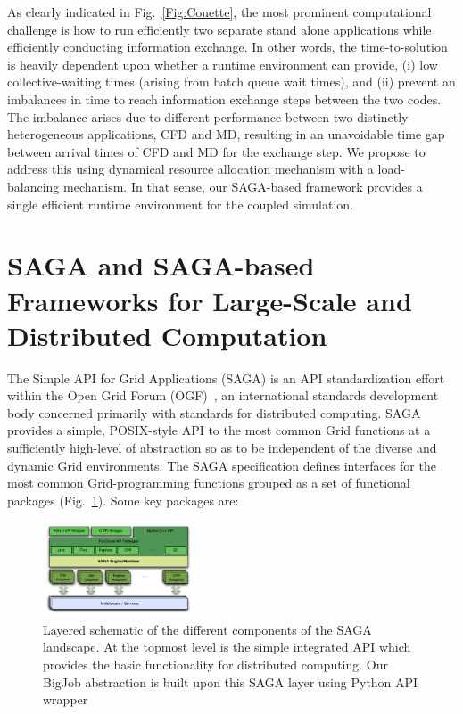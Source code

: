 \documentclass[conference,final]{IEEEtran}
\newcommand{\Nkimnote}[1]{ {\textcolor{green} { ***Nkim: #1 }}}
\newcommand{\Nkimnote}[1]{}
\begin{document}
As clearly indicated in Fig.~\ref{Fig:Couette}, the most prominent
computational challenge is how to run efficiently two separate stand
alone applications while efficiently conducting information exchange.
In other words, the time-to-solution is heavily dependent upon whether
a runtime environment can provide, (i) low collective-waiting times
(arising from batch queue wait times), and (ii) prevent an imbalances
in time to reach information exchange steps between the two codes. The
imbalance arises due to different performance between two distinctly
heterogeneous applications, CFD and MD, resulting in an unavoidable
time gap between arrival times of CFD and MD for the exchange step. We
propose to address this using dynamical resource allocation mechanism
with a load-balancing mechanism. In that sense, our SAGA-based
framework provides a single efficient runtime environment for the
coupled simulation.

\section{SAGA and SAGA-based Frameworks for Large-Scale and Distributed Computation}

The Simple API for Grid Applications (SAGA) is an API standardization
effort within the Open Grid Forum (OGF)~\cite{ogf_web}, an
international standards development body concerned primarily with
standards for distributed computing. SAGA provides a simple,
POSIX-style API to the most common Grid functions at a sufficiently
high-level of abstraction so as to be %
independent of the diverse and dynamic Grid environments. The SAGA
specification defines interfaces for the most common Grid-programming
functions grouped as a set of functional packages
(Fig.~\ref{Fig:SAGA1}). Some key packages are:

\begin{figure}[!ht]
 \begin{center}
     \includegraphics[width=0.40\textwidth]{stci_saga_figures-1.pdf}
 \end{center}
\caption{\small Layered schematic of the different components
  of the SAGA landscape. At the topmost level is the simple integrated API which provides the basic functionality for distributed computing. Our BigJob abstraction is built upon this SAGA layer using Python API wrapper} \label{Fig:SAGA1}
\end{figure}
\end{document}
